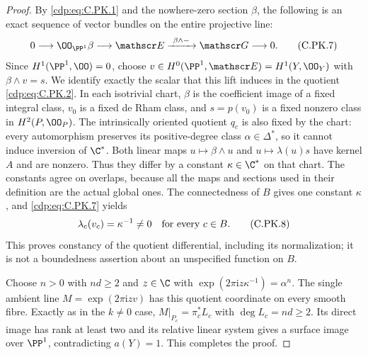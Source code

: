 \begin{proof}
By \eqref{cdp:eq:C.PK.1} and the nowhere-zero section $\beta$, the
following is an exact sequence of vector bundles on the
entire projective line:
\[
 0\longrightarrow\OO_{\PP^1}\beta
  \longrightarrow\mathscr E
  \xrightarrow{\ \beta\wedge-\ }\mathscr G
  \longrightarrow0.
\tag{C.PK.7}\label{cdp:eq:C.PK.7}
\]
Since $H^1(\PP^1,\OO)=0$, choose
$v\in H^0(\PP^1,\mathscr E)=H^1(Y,\OO_Y)$ with
$\beta\wedge v=s$.
We identify exactly the scalar that this lift induces in
the quotient \eqref{cdp:eq:C.PK.2}. In each isotrivial chart,
$\beta$ is the coefficient image of a fixed integral
class, $v_0$ is a fixed de Rham class, and $s=p(v_0)$
is a fixed nonzero class in $H^2(P,\OO_P)$.
The intrinsically oriented quotient $q_c$ is also fixed
by the chart: every automorphism preserves its
positive-degree class $\alpha\in\Delta^*$, so it cannot
induce inversion of $\C^*$.
Both linear maps $u\mapsto\beta\wedge u$ and
$u\mapsto\lambda(u)s$ have kernel $A$ and are nonzero.
Thus they differ by a constant $\kappa\in\C^*$ on
that chart. The constants agree on overlaps, because
all the maps and sections used in their definition are
the actual global ones. The connectedness of $B$ gives
one constant $\kappa$, and \eqref{cdp:eq:C.PK.7} yields
\[
 \lambda_c(v_c)=\kappa^{-1}\ne0
 \quad\hbox{for every }c\in B.
\tag{C.PK.8}\label{cdp:eq:C.PK.8}
\]
This proves constancy of the quotient differential,
including its normalization; it is not a boundedness
assertion about an unspecified function on $B$.

Choose $n>0$ with $nd\ge2$ and $z\in\C$ with
$\exp(2\pi\mathrm i z\kappa^{-1})=\alpha^n$.
The single ambient line $M=\exp(2\pi\mathrm i z v)$
has this quotient coordinate on every smooth fibre.
Exactly as in the $k\ne0$ case,
$M|_{P_c}=\pi_c^*L_c$ with $\deg L_c=nd\ge2$.
Its direct image has rank at least two and its relative
linear system gives a surface image over $\PP^1$,
contradicting $a(Y)=1$. This completes the proof.
\end{proof}


